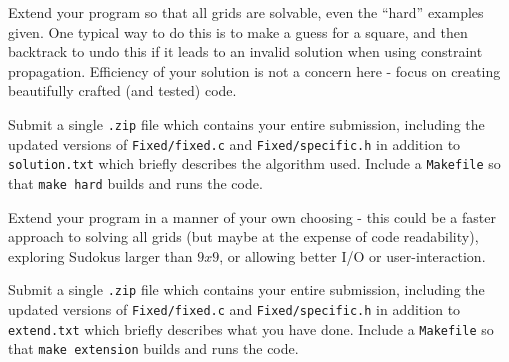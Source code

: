 \begin{exercise}
\label{ex:sudoku2}

Extend your program so that all grids are solvable, even the ``hard''
examples given. One typical way to do this is to make a guess for a
square, and then backtrack to undo this if it leads to an invalid
solution when using constraint propagation.
Efficiency of your solution is not a concern here - focus on creating
beautifully crafted (and tested) code.

\noindent Submit a single \verb^.zip^ file which contains your entire
submission, including the updated versions of \verb^Fixed/fixed.c^
and \verb^Fixed/specific.h^ in addition to \verb^solution.txt^ which
briefly describes the algorithm used.
Include a \verb^Makefile^ so that \verb^make hard^
builds and runs the code.

\end{exercise}

\begin{exercise}
\label{ex:sudoku3}

\noindent Extend your program in a manner of your own choosing - this could be a
faster approach to solving all grids (but maybe at the expense of code
readability), exploring Sudokus larger than $9x9$, or allowing better
I/O or user-interaction.

\noindent Submit a single \verb^.zip^ file which contains your entire
submission, including the updated versions of \verb^Fixed/fixed.c^ and
\verb^Fixed/specific.h^ in addition to \verb^extend.txt^ which briefly
describes what you have done.
Include a \verb^Makefile^ so that \verb^make extension^
builds and runs the code.

\end{exercise}

